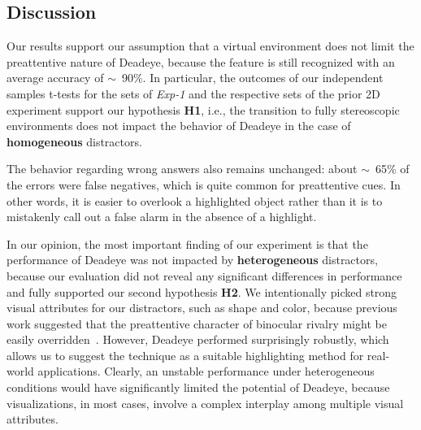 \documentclass[journal]{vgtc}                %
\begin{document}









\subsection{Discussion}

Our results support our assumption that a virtual environment does not limit the preattentive nature of Deadeye, because the feature is still recognized with an average accuracy of $\sim$~90\%. In particular, the outcomes of our independent samples t-tests for the sets of \textit{Exp-1} and the respective sets of the prior 2D experiment support our hypothesis \textbf{H1}, i.e., the transition to fully stereoscopic environments does not impact the behavior of Deadeye in the case of \textbf{homogeneous} distractors.

The behavior regarding wrong answers also remains unchanged: about $\sim$~65\% of the errors were false negatives, which is quite common for preattentive cues. In other words, it is easier to overlook a highlighted object rather than it is to mistakenly call out a false alarm in the absence of a highlight.



In our opinion, the most important finding of our experiment is that the performance of Deadeye was not impacted by \textbf{heterogeneous} distractors, because our evaluation did not reveal any significant differences in performance and fully supported our second hypothesis \textbf{H2}. We intentionally picked strong visual attributes for our distractors, such as shape and color, because previous work suggested that the preattentive character of binocular rivalry might be easily overridden~\cite{zou2017binocularity}. However, Deadeye performed surprisingly robustly, which allows us to suggest the technique as a suitable highlighting method for real-world applications. Clearly, an unstable performance under heterogeneous conditions would have significantly limited the potential of Deadeye, because visualizations, in most cases, involve a complex interplay among multiple visual attributes.
\end{document}
